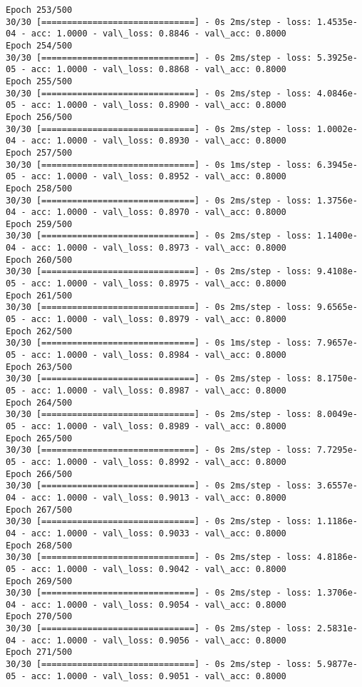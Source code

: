 \documentclass[11pt]{article}
\begin{document}
\begin{Verbatim}[commandchars=\\\{\}]
Epoch 253/500
30/30 [==============================] - 0s 2ms/step - loss: 1.4535e-04 - acc: 1.0000 - val\_loss: 0.8846 - val\_acc: 0.8000
Epoch 254/500
30/30 [==============================] - 0s 2ms/step - loss: 5.3925e-05 - acc: 1.0000 - val\_loss: 0.8868 - val\_acc: 0.8000
Epoch 255/500
30/30 [==============================] - 0s 2ms/step - loss: 4.0846e-05 - acc: 1.0000 - val\_loss: 0.8900 - val\_acc: 0.8000
Epoch 256/500
30/30 [==============================] - 0s 2ms/step - loss: 1.0002e-04 - acc: 1.0000 - val\_loss: 0.8930 - val\_acc: 0.8000
Epoch 257/500
30/30 [==============================] - 0s 1ms/step - loss: 6.3945e-05 - acc: 1.0000 - val\_loss: 0.8952 - val\_acc: 0.8000
Epoch 258/500
30/30 [==============================] - 0s 2ms/step - loss: 1.3756e-04 - acc: 1.0000 - val\_loss: 0.8970 - val\_acc: 0.8000
Epoch 259/500
30/30 [==============================] - 0s 2ms/step - loss: 1.1400e-04 - acc: 1.0000 - val\_loss: 0.8973 - val\_acc: 0.8000
Epoch 260/500
30/30 [==============================] - 0s 2ms/step - loss: 9.4108e-05 - acc: 1.0000 - val\_loss: 0.8975 - val\_acc: 0.8000
Epoch 261/500
30/30 [==============================] - 0s 2ms/step - loss: 9.6565e-05 - acc: 1.0000 - val\_loss: 0.8979 - val\_acc: 0.8000
Epoch 262/500
30/30 [==============================] - 0s 1ms/step - loss: 7.9657e-05 - acc: 1.0000 - val\_loss: 0.8984 - val\_acc: 0.8000
Epoch 263/500
30/30 [==============================] - 0s 2ms/step - loss: 8.1750e-05 - acc: 1.0000 - val\_loss: 0.8987 - val\_acc: 0.8000
Epoch 264/500
30/30 [==============================] - 0s 2ms/step - loss: 8.0049e-05 - acc: 1.0000 - val\_loss: 0.8989 - val\_acc: 0.8000
Epoch 265/500
30/30 [==============================] - 0s 2ms/step - loss: 7.7295e-05 - acc: 1.0000 - val\_loss: 0.8992 - val\_acc: 0.8000
Epoch 266/500
30/30 [==============================] - 0s 2ms/step - loss: 3.6557e-04 - acc: 1.0000 - val\_loss: 0.9013 - val\_acc: 0.8000
Epoch 267/500
30/30 [==============================] - 0s 2ms/step - loss: 1.1186e-04 - acc: 1.0000 - val\_loss: 0.9033 - val\_acc: 0.8000
Epoch 268/500
30/30 [==============================] - 0s 2ms/step - loss: 4.8186e-05 - acc: 1.0000 - val\_loss: 0.9042 - val\_acc: 0.8000
Epoch 269/500
30/30 [==============================] - 0s 2ms/step - loss: 1.3706e-04 - acc: 1.0000 - val\_loss: 0.9054 - val\_acc: 0.8000
Epoch 270/500
30/30 [==============================] - 0s 2ms/step - loss: 2.5831e-04 - acc: 1.0000 - val\_loss: 0.9056 - val\_acc: 0.8000
Epoch 271/500
30/30 [==============================] - 0s 2ms/step - loss: 5.9877e-05 - acc: 1.0000 - val\_loss: 0.9051 - val\_acc: 0.8000

\end{Verbatim}
\end{document}
